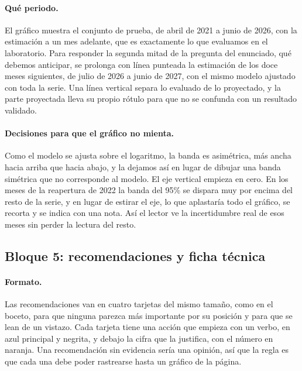 \paragraph{Qué periodo.} El gráfico muestra el conjunto de prueba, de abril de 2021 a junio de
2026, con la estimación a un mes adelante, que es exactamente lo que evaluamos en el laboratorio.
Para responder la segunda mitad de la pregunta del enunciado, qué debemos anticipar, se prolonga
con línea punteada la estimación de los doce meses siguientes, de julio de 2026 a junio de 2027,
con el mismo modelo ajustado con toda la serie. Una línea vertical separa lo evaluado de lo
proyectado, y la parte proyectada lleva su propio rótulo para que no se confunda con un resultado
validado.

\paragraph{Decisiones para que el gráfico no mienta.} Como el modelo se ajusta sobre el
logaritmo, la banda es asimétrica, más ancha hacia arriba que hacia abajo, y la dejamos así en
lugar de dibujar una banda simétrica que no corresponde al modelo. El eje vertical empieza en
cero. En los meses de la reapertura de 2022 la banda del 95\% se dispara muy por encima del resto
de la serie, y en lugar de estirar el eje, lo que aplastaría todo el gráfico, se recorta y se
indica con una nota. Así el lector ve la incertidumbre real de esos meses sin perder la lectura
del resto.

\subsection{Bloque 5: recomendaciones y ficha técnica}

\paragraph{Formato.} Las recomendaciones van en cuatro tarjetas del mismo tamaño, como en el
boceto, para que ninguna parezca más importante por su posición y para que se lean de un vistazo.
Cada tarjeta tiene una acción que empieza con un verbo, en azul principal y negrita, y debajo la
cifra que la justifica, con el número en naranja. Una recomendación sin evidencia sería una
opinión, así que la regla es que cada una debe poder rastrearse hasta un gráfico de la página.


